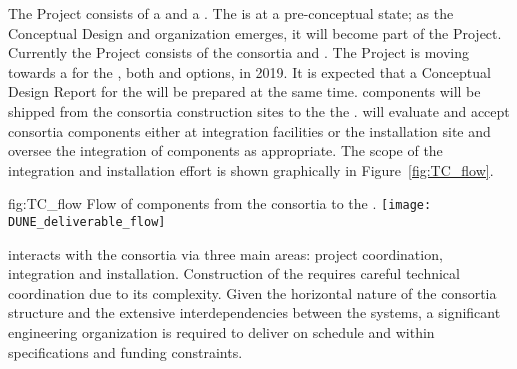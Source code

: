 The  Project consists of a  and a
. The  is at a pre-conceptual state; as the
Conceptual Design and organization emerges, it will become part of the
 Project. Currently the  Project consists of
the   consortia and .  The
 Project is moving towards a  for
the , both \single and \dual options, in 2019. It is
expected that a Conceptual Design Report for the  will be
prepared at the same time.  components will be shipped
from the consortia construction sites to the the .  will
evaluate and accept consortia components either at integration
facilities or the installation site and oversee the integration of
components as appropriate. The scope of the  integration
and installation effort is shown graphically in
Figure~\ref{fig:TC_flow}.

\begin{dunefigure}{fig:TC_flow}
  {Flow of components from the consortia to the .}
 \texttt{[image: DUNE\_deliverable\_flow]}
\end{dunefigure}

 interacts with the consortia via three main areas: project
coordination, integration and installation.  Construction of the
  requires careful technical coordination due to
its complexity.  Given the horizontal nature of the consortia
structure and the extensive interdependencies between the systems, a
significant engineering organization is required to deliver
 on schedule and within specifications and funding
constraints.

